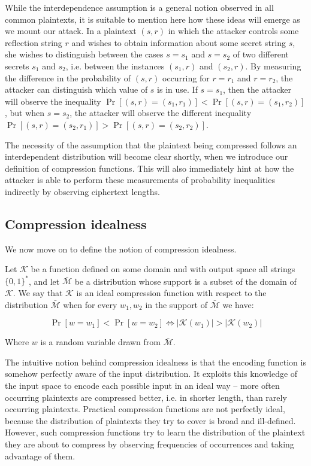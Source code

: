 \documentclass[conference, letterpaper, 10pt]{IEEEtran}
\begin{document}
While the interdependence assumption is a general notion observed in all common
plaintexts, it is suitable to mention here how these ideas will emerge as we
mount our attack. In a plaintext $(s, r)$ in which the attacker controls some
reflection string $r$ and wishes to obtain information about some secret string
$s$, she wishes to distinguish between the cases $s = s_1$ and $s = s_2$ of two
different secrets $s_1$ and $s_2$, i.e. between the instances $(s_1, r)$ and
$(s_2, r)$. By measuring the difference in the probability of $(s, r)$
occurring for $r = r_1$ and $r = r_2$, the attacker can distinguish which value
of $s$ is in use. If $s = s_1$, then the attacker will observe the inequality
$\Pr[(s, r) = (s_1, r_1)] < \Pr[(s, r) = (s_1, r_2)]$, but when $s = s_2$, the
attacker will observe the different inequality $\Pr[(s, r) = (s_2, r_1)] >
\Pr[(s, r) = (s_2, r_2)]$.

The necessity of the assumption that the plaintext being compressed follows an
interdependent distribution will become clear shortly, when we introduce our
definition of compression functions. This will also immediately hint at how the
attacker is able to perform these measurements of probability inequalities
indirectly by observing ciphertext lengths.

\subsection{Compression idealness}

We now move on to define the notion of compression idealness.

Let $\mathcal{K}$ be a function defined on some domain and with output space
all strings $\{0, 1\}^*$, and let $\bar{\mathcal{M}}$ be a distribution whose
support is a subset of the domain of $\mathcal{K}$.  We say that $\mathcal{K}$
is an ideal compression function with respect to the distribution
$\bar{\mathcal{M}}$ when for every $w_1, w_2$ in the support of
$\bar{\mathcal{M}}$ we have:

\begin{equation*}
\Pr[w = w_1] < \Pr[w = w_2] \iff \lvert\mathcal{K}(w_1)\rvert > \lvert\mathcal{K}(w_2)\rvert
\end{equation*}

Where $w$ is a random variable drawn from $\bar{\mathcal{M}}$.

The intuitive notion behind compression idealness is that the encoding
function is somehow perfectly aware of the input distribution. It
exploits this knowledge of the input space to encode each possible
input in an ideal way – more often occurring plaintexts are compressed
better, i.e. in shorter length, than rarely occurring plaintexts.
Practical compression functions are not perfectly ideal, because the
distribution of plaintexts they try to cover is broad and ill-defined.
However, such compression functions try to learn the distribution of
the plaintext they are about to compress by observing frequencies of
occurrences and taking advantage of them.
\end{document}
